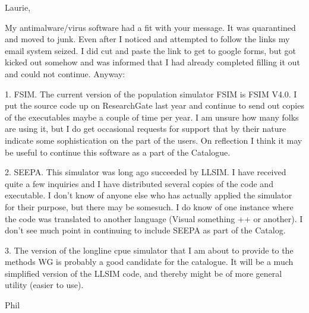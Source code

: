 Laurie,

My antimalware/virus software had a fit with your message. It was quarantined and moved to junk. Even after I noticed and attempted to follow the links my email system seized. I did cut and paste the link to get to google forms, but got kicked out somehow and was informed that I had already completed filling it out and could not continue. Anyway:

 

1. FSIM. The current version of the population simulator FSIM is FSIM V4.0. I put the source code up on ResearchGate last year and continue to send out copies of the executables maybe a couple of time per year.  I am unsure how many folks are using it, but I do get occasional requests for support that by their nature indicate some sophistication on the part of the users. On reflection I think it may be useful to continue this software as a part of the Catalogue.

2. SEEPA. This simulator was long ago succeeded by LLSIM. I have received quite a few inquiries and I have distributed several copies of the code and executable. I don't know of anyone else who has actually applied the simulator for their purpose, but there may be somesuch. I do know of one instance where the code was translated to another language (Visual something ++ or another). I don't see much point in continuing to include SEEPA as part of the Catalog.

3. The version of the longline cpue simulator that I am about to provide to the methods WG is probably a good candidate for the catalogue. It will be a much simplified version of the LLSIM code, and thereby might be of more general utility (easier to use).

Phil 
